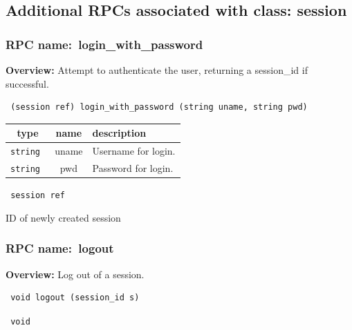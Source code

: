 \subsection{Additional RPCs associated with class: session}
\subsubsection{RPC name:~login\_with\_password}

{\bf Overview:} 
Attempt to authenticate the user, returning a session\_id if successful.

\begin{verbatim} (session ref) login_with_password (string uname, string pwd)\end{verbatim}



 
\vspace{0.3cm}
\begin{tabular}{|c|c|p{7cm}|}
 \hline
{\bf type} & {\bf name} & {\bf description} \\ \hline
{\tt string } & uname & Username for login. \\ \hline 

{\tt string } & pwd & Password for login. \\ \hline 

\end{tabular}

\vspace{0.3cm}

{\tt 
session ref
}


ID of newly created session
\vspace{0.3cm}
\vspace{0.3cm}
\vspace{0.3cm}
\subsubsection{RPC name:~logout}

{\bf Overview:} 
Log out of a session.

\begin{verbatim} void logout (session_id s)\end{verbatim}


\vspace{0.3cm}

{\tt 
void
}



